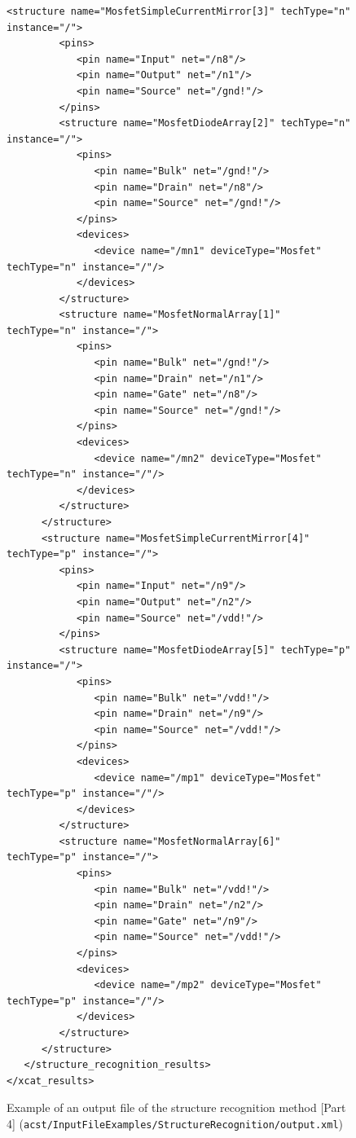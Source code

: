 \begin{figure}[H]
	\begin{lstlisting}[basicstyle=\ttfamily\scriptsize,backgroundcolor={\color{gray!30}}, escapechar=? ]
      <structure name="MosfetSimpleCurrentMirror[3]" techType="n" instance="/">
         <pins>
            <pin name="Input" net="/n8"/>
            <pin name="Output" net="/n1"/>
            <pin name="Source" net="/gnd!"/>
         </pins>
         <structure name="MosfetDiodeArray[2]" techType="n" instance="/">
            <pins>
               <pin name="Bulk" net="/gnd!"/>
               <pin name="Drain" net="/n8"/>
               <pin name="Source" net="/gnd!"/>
            </pins>
            <devices>
               <device name="/mn1" deviceType="Mosfet" techType="n" instance="/"/>
            </devices>
         </structure>
         <structure name="MosfetNormalArray[1]" techType="n" instance="/">
            <pins>
               <pin name="Bulk" net="/gnd!"/>
               <pin name="Drain" net="/n1"/>
               <pin name="Gate" net="/n8"/>
               <pin name="Source" net="/gnd!"/>
            </pins>
            <devices>
               <device name="/mn2" deviceType="Mosfet" techType="n" instance="/"/>
            </devices>
         </structure>
      </structure>
      <structure name="MosfetSimpleCurrentMirror[4]" techType="p" instance="/">
         <pins>
            <pin name="Input" net="/n9"/>
            <pin name="Output" net="/n2"/>
            <pin name="Source" net="/vdd!"/>
         </pins>
         <structure name="MosfetDiodeArray[5]" techType="p" instance="/">
            <pins>
               <pin name="Bulk" net="/vdd!"/>
               <pin name="Drain" net="/n9"/>
               <pin name="Source" net="/vdd!"/>
            </pins>
            <devices>
               <device name="/mp1" deviceType="Mosfet" techType="p" instance="/"/>
            </devices>
         </structure>
         <structure name="MosfetNormalArray[6]" techType="p" instance="/">
            <pins>
               <pin name="Bulk" net="/vdd!"/>
               <pin name="Drain" net="/n2"/>
               <pin name="Gate" net="/n9"/>
               <pin name="Source" net="/vdd!"/>
            </pins>
            <devices>
               <device name="/mp2" deviceType="Mosfet" techType="p" instance="/"/>
            </devices>
         </structure>
      </structure>
   </structure_recognition_results>
</xcat_results>
	\end{lstlisting}
	\caption{Example of an output file of the structure recognition method [Part 4] ({\tt acst/InputFileExamples/StructureRecognition/output.xml})}
\end{figure}

